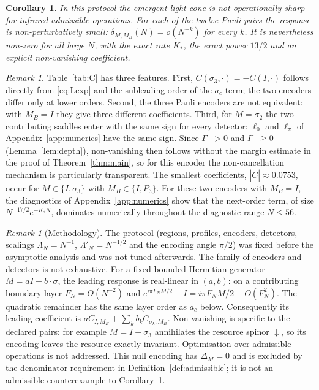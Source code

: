 \documentclass[11pt]{amsart}
\newtheorem{corollary}[theorem]{Corollary}
\theoremstyle{definition}
\theoremstyle{remark}
\newtheorem{remark}[theorem]{Remark}
\newcommand{\dn}{{\downarrow}}
\begin{document}
\begin{corollary}\label{cor:suppressed}
In this protocol the emergent light cone is not operationally sharp for
infrared-admissible operations.  For each of the twelve Pauli pairs the response is
non-perturbatively small: $\delta_{M,M_B}(N)=o(N^{-k})$ for every $k$.  It is
nevertheless non-zero for all large $N$, with the exact rate $K_*$, the exact
power $13/2$ and an explicit non-vanishing coefficient.
\end{corollary}

\begin{remark}\label{rem:features}
Table~\ref{tab:C} has three features. First,
$C(\sigma_3,\cdot)=-C(I,\cdot)$ follows directly from
\eqref{eq:Lexp} and the subleading order of the $a_c$ term;
the two encoders differ only at lower orders.  Second, the three Pauli
encoders are not equivalent: with $M_B=I$ they give three different
coefficients.  Third, for $M=\sigma_2$ the two contributing saddles enter with
the same sign for every detector: $\ell_0$ and $\ell_\pi$ of
Appendix~\ref{app:numerics} have the same sign.  Since $\Gamma_+>0$ and
$\Gamma_-\ge0$ (Lemma~\ref{lem:depth}), non-vanishing then follows without
the margin estimate in the proof of Theorem~\ref{thm:main}, so for this
encoder the non-cancellation mechanism is particularly transparent.  The smallest coefficients,
$|\overline C|\approx0.0753$, occur for $M\in\{I,\sigma_3\}$ with
$M_B\in\{I,P_3\}$.  For these two encoders with $M_B=I$, the diagnostics of
Appendix~\ref{app:numerics} show that the next-order term, of size
$N^{-17/2}e^{-K_*N}$, dominates numerically throughout the diagnostic range
$N\le56$.
\end{remark}

\begin{remark}[Methodology]
The protocol (regions, profiles, encoders, detectors, scalings
$\Lambda_N=N^{-1}$, $\Lambda'_N=N^{-1/2}$ and the encoding angle $\pi/2$) was fixed before
the asymptotic analysis and was not tuned afterwards.  The family of
encoders and detectors is not exhaustive. For a fixed bounded Hermitian
generator $M=aI+b\cdot\sigma$, the leading response is real-linear in
$(a,b)$: on a contributing boundary layer $F_N=O(N^{-2})$ and
$e^{i\pi F_NM/2}-I=i\pi F_NM/2+O(F_N^2)$.
The quadratic remainder has the same layer order as $a_c$ below.
Consequently its leading coefficient is
$aC_{I,M_B}+\sum_k b_k C_{\sigma_k,M_B}$.
Non-vanishing is specific to the declared pairs: for example
$M=I+\sigma_3$ annihilates the resource spinor $\dn$, so its encoding
leaves the resource exactly invariant. Optimisation over admissible
operations is not addressed.
This null encoding has $\Delta_M=0$ and is excluded by the denominator
requirement in Definition~\ref{def:admissible}; it is not an admissible
counterexample to Corollary~\ref{cor:suppressed}.
\end{remark}
\end{document}
